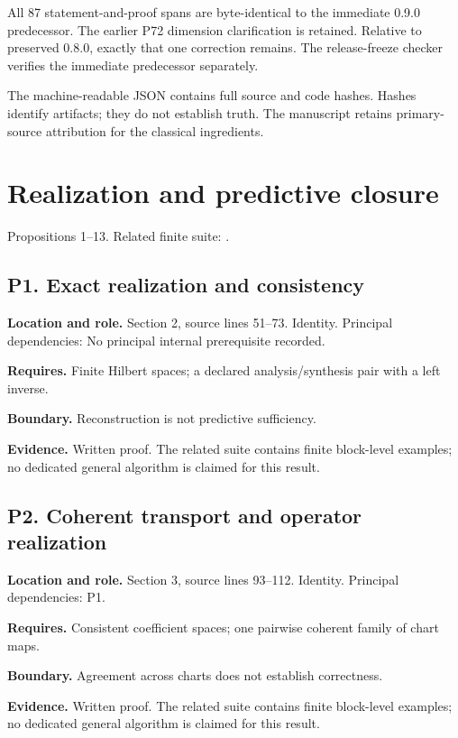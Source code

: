 \documentclass[11pt,letterpaper]{article}
\begin{document}
All 87 statement-and-proof spans are byte-identical to the immediate
0.9.0 predecessor. The earlier P72 dimension clarification is retained.
Relative to preserved 0.8.0, exactly that one correction remains. The
release-freeze checker verifies the immediate predecessor separately.

The machine-readable JSON contains full source and code hashes. Hashes
identify artifacts; they do not establish truth. The manuscript retains
primary-source attribution for the classical ingredients.

\newpage

\section{Realization and predictive
closure}\label{realization-and-predictive-closure}

Propositions 1--13. Related finite suite:
.

\par\noindent\begin{minipage}{\textwidth}
\subsection{P1. Exact realization and
consistency}\label{p1.-exact-realization-and-consistency}

\textbf{Location and role.} Section 2, source lines 51--73. Identity.
Principal dependencies: No principal internal prerequisite recorded.

\textbf{Requires.} Finite Hilbert spaces; a declared analysis/synthesis
pair with a left inverse.

\textbf{Boundary.} Reconstruction is not predictive sufficiency.

\textbf{Evidence.} Written proof. The related suite contains finite
block-level examples; no dedicated general algorithm is claimed for this
result.
\end{minipage}\par\medskip

\par\noindent\begin{minipage}{\textwidth}
\subsection{P2. Coherent transport and operator
realization}\label{p2.-coherent-transport-and-operator-realization}

\textbf{Location and role.} Section 3, source lines 93--112. Identity.
Principal dependencies: P1.

\textbf{Requires.} Consistent coefficient spaces; one pairwise coherent
family of chart maps.

\textbf{Boundary.} Agreement across charts does not establish
correctness.

\textbf{Evidence.} Written proof. The related suite contains finite
block-level examples; no dedicated general algorithm is claimed for this
result.
\end{minipage}\par\medskip
\end{document}
